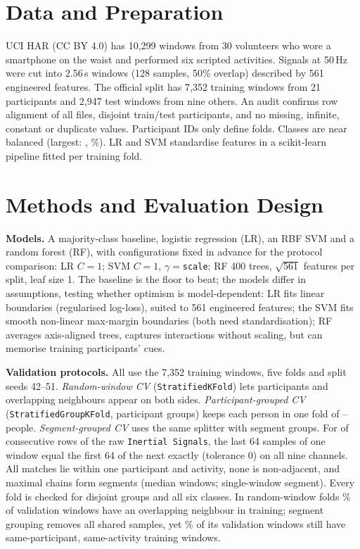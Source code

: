 \documentclass{article}
\begin{document}
\section{Data and Preparation}
UCI HAR \citep{anguita2013,uci_har} (CC BY 4.0) has 10,299 windows from 30 volunteers who wore a smartphone on the waist and performed six scripted activities. Signals at 50\,Hz were cut into 2.56\,s windows (128 samples, 50\% overlap) described by 561 engineered features. The official split has 7,352 training windows from 21 participants and 2,947 test windows from nine others. An audit confirms row alignment of all files, disjoint train/test participants, and no missing, infinite, constant or duplicate values. Participant IDs only define folds. Classes are near balanced (largest: \Nmajlabel, \Nmajshare\%). LR and SVM standardise features in a scikit-learn pipeline \citep{sklearn} fitted per training fold.

\section{Methods and Evaluation Design}
\textbf{Models.} A majority-class baseline, logistic regression (LR), an RBF SVM and a random forest (RF), with configurations fixed in advance for the protocol comparison: LR $C{=}1$; SVM $C{=}1$, $\gamma{=}$\texttt{scale}; RF 400 trees, $\sqrt{561}$ features per split, leaf size 1. The baseline is the floor to beat; the models differ in assumptions, testing whether optimism is model-dependent: LR fits linear boundaries (regularised log-loss), suited to 561 engineered features; the SVM fits smooth non-linear max-margin boundaries (both need standardisation); RF averages axis-aligned trees, captures interactions without scaling, but can memorise training participants' cues.

\textbf{Validation protocols.} All use the 7,352 training windows, five folds and split seeds 42--51. \emph{Random-window CV} (\texttt{StratifiedKFold}) lets participants and overlapping neighbours appear on both sides. \emph{Participant-grouped CV} (\texttt{StratifiedGroupKFold}, participant groups) keeps each person in one fold of \Ngrpvalsubjmin--\Ngrpvalsubjmax{} people. \emph{Segment-grouped CV} uses the same splitter with segment groups. For \Nnlinks{} of \Nnpairs{} consecutive rows of the raw \texttt{Inertial Signals}, the last 64 samples of one window equal the first 64 of the next exactly (tolerance 0) on all nine channels. All matches lie within one participant and activity, none is non-adjacent, and maximal chains form \Nnseg{} segments (median \Nseglenmed{} windows; \Nnsingleseg{} single-window segment). Every fold is checked for disjoint groups and all six classes. In random-window folds \NoverlapR\% of validation windows have an overlapping neighbour in training; segment grouping removes all shared samples, yet \NsaS\% of its validation windows still have same-participant, same-activity training windows.
\end{document}
